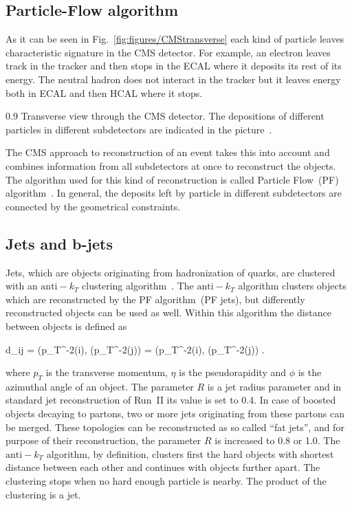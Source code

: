 \subsection{Particle-Flow algorithm}

As it can be seen in Fig.~\ref{fig:figures/CMStransverse} each kind of particle leaves characteristic signature in the CMS detector. For example, an electron leaves track in the tracker and then stops in the ECAL where it deposits its rest of its energy. The neutral hadron does not interact in the tracker but it leaves energy both in ECAL and then HCAL where it stops.

                 {0.9}       %
                 { Transverse view through the CMS detector. The depositions of different particles in different subdetectors are indicated in the picture~\cite{Sirunyan:2017ulk}. }

The CMS approach to reconstruction of an event takes this into account and combines information from all subdetectors at once to reconstruct the objects. The algorithm used for this kind of reconstruction is called Particle Flow~(PF) algorithm~\cite{Sirunyan:2017ulk}. In general, the deposits left by particle in different subdetectors are connected by the geometrical constraints.

\subsection{Jets and b-jets}

Jets, which are objects originating from hadronization of quarks, are clustered with an $\mathrm{anti-}k_{T}$ clustering algorithm~\cite{Cacciari:2008gp}. The $\mathrm{anti-}k_{T}$ algorithm clusters objects which are reconstructed by the PF algorithm~(PF jets), but differently reconstructed objects can be used as well. Within this algorithm the distance between objects is defined as

{   
    d_{ij} = (p_{T}^{-2}(i), (p_{T}^{-2}(j))  =  (p_{T}^{-2}(i), (p_{T}^{-2}(j)) .
}

where $p_{T}$ is the transverse momentum, $\eta$ is the pseudorapidity and $\phi$ is the azimuthal angle of an object. The parameter $R$ is a jet radius parameter and in standard jet reconstruction of Run~II its value is set to 0.4. In case of boosted objects decaying to partons, two or more jets originating from these partons can be merged. These topologies can be reconstructed as so called ``fat jets'', and for purpose of their reconstruction, the parameter $R$ is increased to 0.8 or 1.0. The $\mathrm{anti-}k_{T}$ algorithm, by definition, clusters first the hard objects with shortest distance between each other and continues with objects further apart. The clustering stops when no hard enough particle is nearby. The product of the clustering is a jet.

